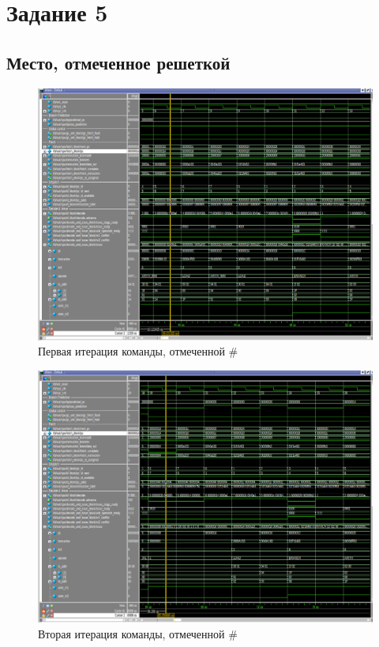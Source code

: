 \documentclass{article}
\begin{document}
\clearpage\section{Задание 5}
\subsection{Место, отмеченное решеткой}
\begin{figure}[h]
	\centering
	\includegraphics[scale=0.4]{tools/task5_1.png}
	\caption{Первая итерация команды, отмеченной \#}
\end{figure}

\begin{figure}[h]
	\centering
	\includegraphics[scale=0.4]{tools/task5_2.png}
	\caption{Вторая итерация команды, отмеченной \#}
\end{figure}
\end{document}
